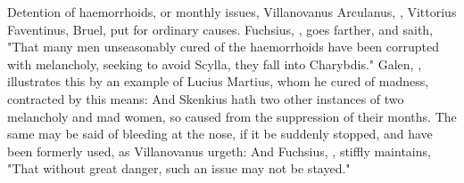 Detention of haemorrhoids, or monthly issues, Villanovanus
 Arculanus,
, Vittorius Faventinus,
 Bruel, \etc{} put for
ordinary causes. Fuchsius, , goes
farther, and saith, "That many men unseasonably cured of
the haemorrhoids have been corrupted with melancholy, seeking to avoid Scylla,
they fall into Charybdis." Galen, , illustrates this by an example of Lucius Martius, whom he cured of
madness, contracted by this means: And Skenkius hath two
other instances of two melancholy and mad women, so caused from the suppression
of their months. The same may be said of bleeding at the nose, if it be
suddenly stopped, and have been formerly used, as
Villanovanus urgeth: And Fuchsius,
, stiffly maintains, "That
without great danger, such an issue may not be stayed."

